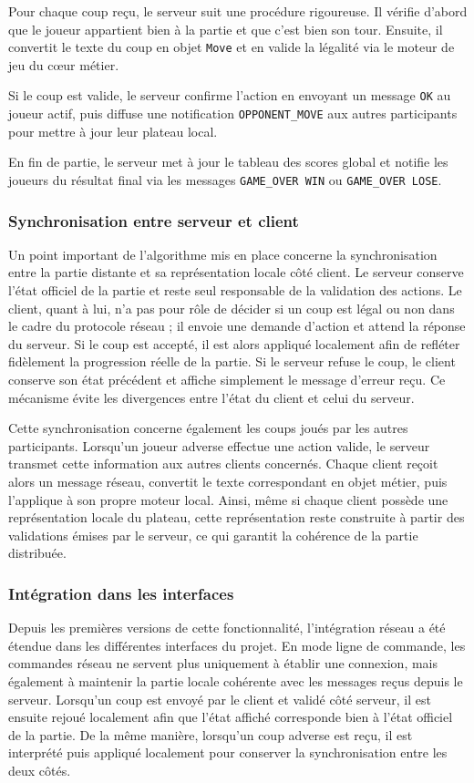 \documentclass[a4paper]{article}
\begin{document}
Pour chaque coup reçu, le serveur suit une procédure rigoureuse. Il vérifie d'abord que le joueur appartient bien à la partie et que c'est bien son tour. Ensuite, il convertit le texte du coup en objet \texttt{Move} et en valide la légalité via le moteur de jeu du cœur métier.

Si le coup est valide, le serveur confirme l'action en envoyant un message \texttt{OK} au joueur actif, puis diffuse une notification \texttt{OPPONENT\_MOVE} aux autres participants pour mettre à jour leur plateau local.

En fin de partie, le serveur met à jour le tableau des scores global et notifie les joueurs du résultat final via les messages \texttt{GAME\_OVER WIN} ou \texttt{GAME\_OVER LOSE}.


\subsubsection{Synchronisation entre serveur et client}
Un point important de l’algorithme mis en place concerne la synchronisation entre la partie distante et sa représentation locale côté client. Le serveur conserve l’état officiel de la partie et reste seul responsable de la validation des actions. Le client, quant à lui, n’a pas pour rôle de décider si un coup est légal ou non dans le cadre du protocole réseau ; il envoie une demande d’action et attend la réponse du serveur. Si le coup est accepté, il est alors appliqué localement afin de refléter fidèlement la progression réelle de la partie. Si le serveur refuse le coup, le client conserve son état précédent et affiche simplement le message d’erreur reçu. Ce mécanisme évite les divergences entre l’état du client et celui du serveur.

Cette synchronisation concerne également les coups joués par les autres participants. Lorsqu’un joueur adverse effectue une action valide, le serveur transmet cette information aux autres clients concernés. Chaque client reçoit alors un message réseau, convertit le texte correspondant en objet métier, puis l’applique à son propre moteur local. Ainsi, même si chaque client possède une représentation locale du plateau, cette représentation reste construite à partir des validations émises par le serveur, ce qui garantit la cohérence de la partie distribuée.

\subsubsection{Intégration dans les interfaces}
Depuis les premières versions de cette fonctionnalité, l’intégration réseau a été étendue dans les différentes interfaces du projet. En mode ligne de commande, les commandes réseau ne servent plus uniquement à établir une connexion, mais également à maintenir la partie locale cohérente avec les messages reçus depuis le serveur. Lorsqu’un coup est envoyé par le client et validé côté serveur, il est ensuite rejoué localement afin que l’état affiché corresponde bien à l’état officiel de la partie. De la même manière, lorsqu’un coup adverse est reçu, il est interprété puis appliqué localement pour conserver la synchronisation entre les deux côtés.
\end{document}
